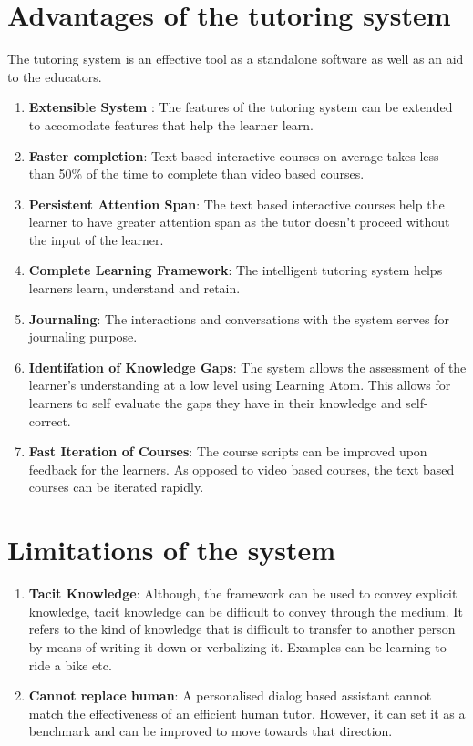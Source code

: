 \documentclass[]{article}
\begin{document}
\section[Advantages]{Advantages of the tutoring system}
The tutoring system is an effective tool as a standalone software as well as an aid to the educators.
\begin{enumerate}
  \item \textbf{Extensible System }: The features of the tutoring system can be extended to accomodate features that help the learner learn.  
  \item \textbf{Faster completion}: Text based interactive courses on average takes less than 50\% of the time to complete than video based courses.   
  \item \textbf{Persistent Attention Span}: The text based interactive courses help the learner to have greater attention span as the tutor doesn't proceed without the input of the learner.     
  \item \textbf{Complete Learning Framework}: The intelligent tutoring system helps learners learn, understand and retain. 
  \item \textbf{Journaling}: The interactions and conversations with the system serves for journaling purpose. 
  \item \textbf{Identifation of Knowledge Gaps}: The system allows the assessment of the learner's understanding at a low level using Learning Atom. This allows for learners to self evaluate the gaps they have in their knowledge and self-correct.
  \item \textbf{Fast Iteration of Courses}: The course scripts can be improved upon feedback for the learners. As opposed to video based courses, the text based courses can be iterated rapidly.   
\end{enumerate}


\section[Limitations]{Limitations of the system}
\begin{enumerate}
  \item \textbf{Tacit Knowledge}: Although, the framework can be used to convey explicit knowledge, tacit knowledge can be difficult to convey through the medium. It refers to the kind of knowledge that is difficult to transfer to another person by means of writing it down or verbalizing it. Examples can be learning to ride a bike etc. 
  \item \textbf{Cannot replace human}: A personalised dialog based assistant cannot match the effectiveness of an efficient human tutor. However, it can set it as a benchmark and can be improved to move towards that direction.
\end{enumerate}
\end{document}
